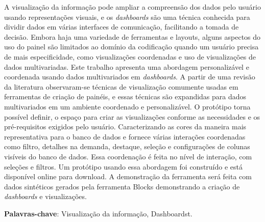 \documentclass[
	12pt,				%
	openright,			%
	oneside,			%
	a4paper,			%
	english,			%
	brazil				%
	]{abntex2}
\begin{document}
\setlength{\absparsep}{18pt} %
\begin{resumo}
A visualização da informação pode ampliar a compreensão dos dados pelo usuário usando representações visuais, e os \textit{dashboards} são uma técnica conhecida para dividir dados em várias interfaces de comunicação, facilitando a tomada de decisão. Embora haja uma variedade de ferramentas e layouts, alguns aspectos do uso do painel são limitados ao domínio da codificação quando um usuário precisa de mais especificidade, como visualizações coordenadas e uso de visualizações de dados multivariadas. Este trabalho apresenta uma abordagem personalizável e coordenada usando dados multivariados em \textit{dashboards}. A partir de uma revisão da literatura observaram-se técnicas de visualização comumente usadas em ferramentas de criação de painéis, e essas técnicas são expandidas para dados multivariados em um ambiente coordenado e personalizável. O protótipo torna possível definir, o espaço para criar as visualizações conforme as necessidades e os pré-requisitos exigidos pelo usuário. Caracterizando as cores da maneira mais representativa para o banco de dados e fornece várias interações coordenadas como filtro, detalhes na demanda, destaque, seleção e configurações de colunas visíveis do banco de dados. Essa coordenação é feita no nível de interação, com seleções e filtros. Um protótipo usando essa abordagem foi construído e está disponível online para download. A demonstração da ferramenta será feita com dados sintéticos gerados pela ferramenta  Blocks \cite{blocks} demonstrando a criação de \textit{dashboards} e visualizações. 

 \textbf{Palavras-chave}: Visualização da informação, Dashboardst.
\end{resumo}
\end{document}
